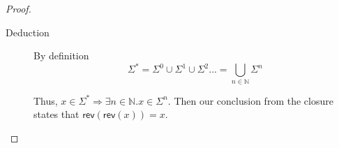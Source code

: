 \documentclass{article}
\begin{document}
\begin{proof}
\begin{description}
    \item[Deduction]
        By definition 
        $$\Sigma^* = \Sigma^0 \cup \Sigma^1 \cup \Sigma^2 ... = \bigcup_{n \in \mathbb{N}}\Sigma^n$$

    Thus, $x \in \Sigma^* \Rightarrow \exists n \in \mathbb{N}.x \in \Sigma^n$. Then our conclusion from the closure states that $\mathsf{rev}(\mathsf{rev}(x)) = x$.

    \end{description}
\end{proof}
\end{document}

